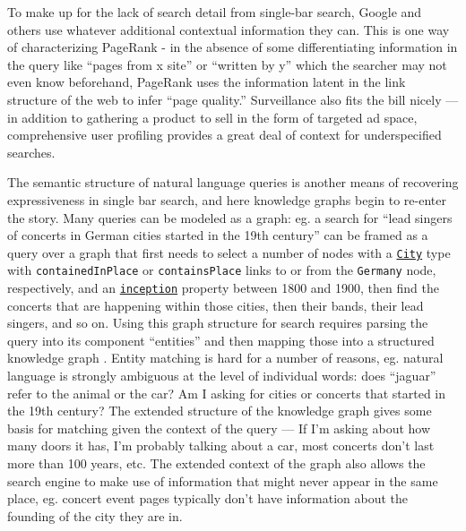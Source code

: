 To make up for the lack of search detail from single-bar search, Google
and others use whatever additional contextual information they can. This
is one way of characterizing PageRank - in the absence of some
differentiating information in the query like ``pages from x site'' or
``written by y'' which the searcher may not even know beforehand,
PageRank uses the information latent in the link structure of the web to
infer ``page quality.'' Surveillance also fits the bill nicely --- in
addition to gathering a product to sell in the form of targeted ad
space, comprehensive user profiling provides a great deal of context for
underspecified searches.

The semantic structure of natural language queries is another means of
recovering expressiveness in single bar search, and here knowledge
graphs begin to re-enter the story. Many queries can be modeled as a
graph: eg. a search for ``lead singers of concerts in German cities
started in the 19th century'' can be framed as a query over a graph that
first needs to select a number of nodes with a
\href{https://schema.org/City}{\texttt{City}} type with
\texttt{containedInPlace} or \texttt{containsPlace} links to or from the
\texttt{Germany} node, respectively, and an
\href{https://www.wikidata.org/wiki/Property:P571}{\texttt{inception}}
property between 1800 and 1900, then find the concerts that are
happening within those cities, then their bands, their lead singers, and
so on. Using this graph structure for search requires parsing the query
into its component ``entities'' and then mapping those into a structured
knowledge graph \cite{liUnderstandingSemanticStructure2010, reisingerFineGrainedClassLabel2011, pascaWhatYouSeek2007} . Entity
matching is hard for a number of reasons, eg. natural language is
strongly ambiguous at the level of individual words: does ``jaguar''
refer to the animal or the car? Am I asking for cities or concerts that
started in the 19th century? The extended structure of the knowledge
graph gives some basis for matching given the context of the query ---
If I'm asking about how many doors it has, I'm probably talking about a
car, most concerts don't last more than 100 years, etc. The extended
context of the graph also allows the search engine to make use of
information that might never appear in the same place, eg. concert event
pages typically don't have information about the founding of the city
they are in.


